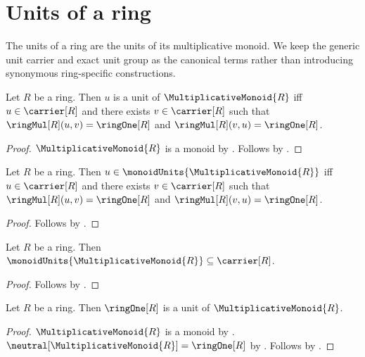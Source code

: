 



\section{Units of a ring}

The units of a ring are the units of its multiplicative monoid.  We keep the
generic unit carrier and exact unit group as the canonical terms rather than
introducing synonymous ring-specific constructions.

\begin{theorem}\label{ring_unit_iff}
    Let $R$ be a ring.
    Then $u$ is a unit of $\MultiplicativeMonoid{R}$ iff
        $u\in\carrier[R]$ and
        there exists $v\in\carrier[R]$ such that
            $\ringMul[R](u,v)=\ringOne[R]$ and
            $\ringMul[R](v,u)=\ringOne[R]$.
\end{theorem}
\begin{proof}
    $\MultiplicativeMonoid{R}$ is a monoid by
        .
    Follows by
        .
\end{proof}

\begin{theorem}\label{ring_units_iff}
    Let $R$ be a ring.
    Then $u\in\monoidUnits{\MultiplicativeMonoid{R}}$ iff
        $u\in\carrier[R]$ and
        there exists $v\in\carrier[R]$ such that
            $\ringMul[R](u,v)=\ringOne[R]$ and
            $\ringMul[R](v,u)=\ringOne[R]$.
\end{theorem}
\begin{proof}
    Follows by
        .
\end{proof}

\begin{proposition}\label{ring_units_subseteq_carrier}
    Let $R$ be a ring.
    Then $\monoidUnits{\MultiplicativeMonoid{R}}
        \subseteq\carrier[R]$.
\end{proposition}
\begin{proof}
    Follows by
        .
\end{proof}

\begin{proposition}\label{ring_one_is_unit}
    Let $R$ be a ring.
    Then $\ringOne[R]$ is a unit of $\MultiplicativeMonoid{R}$.
\end{proposition}
\begin{proof}
    $\MultiplicativeMonoid{R}$ is a monoid by
        .
    $\neutral[\MultiplicativeMonoid{R}]=\ringOne[R]$ by
        .
    Follows by .
\end{proof}

